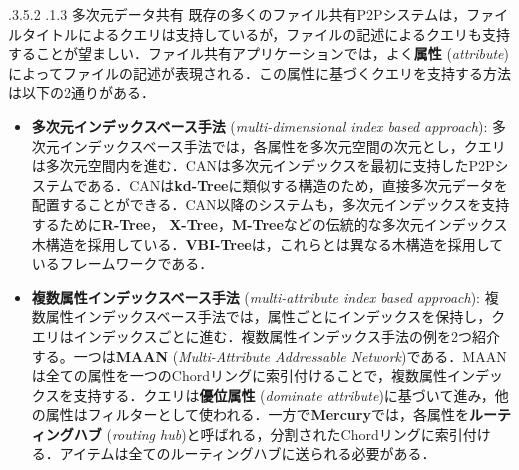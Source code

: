\documentclass{jarticle}
\makeatletter
\renewcommand{\subsection}{\@startsection{subsection}{2}{\z@}%
   {.3\Cvs \@plus.5\Cvs \@minus.2\Cvs}%
   {.1\Cvs \@plus.3\Cvs}%
   {\reset@font\large\bfseries}}
\makeatother
\begin{document}
{\small

\setcounter{section}{4} 
\setcounter{subsection}{0}

\subsection{多次元データ共有}
既存の多くのファイル共有P2Pシステムは，ファイルタイトルによるクエリは支持しているが，ファイルの記述によるクエリも支持することが望ましい．ファイル共有アプリケーションでは，よく\textbf{属性} (\textit{attribute})によってファイルの記述が表現される．この属性に基づくクエリを支持する方法は以下の2通りがある．
\begin{itemize}
	\item\textbf{多次元インデックスベース手法} (\textit{multi-dimensional index based approach}): 多次元インデックスベース手法では，各属性を多次元空間の次元とし，クエリは多次元空間内を進む．CANは多次元インデックスを最初に支持したP2Pシステムである．CANは\textbf{kd-Tree}に類似する構造のため，直接多次元データを配置することができる．CAN以降のシステムも，多次元インデックスを支持するために\textbf{R-Tree}， \textbf{X-Tree}，\textbf{M-Tree}などの伝統的な多次元インデックス木構造を採用している．\textbf{VBI-Tree}は，これらとは異なる木構造を採用しているフレームワークである．

	\item\textbf{複数属性インデックスベース手法} (\textit{multi-attribute index based approach}): 複数属性インデックスベース手法では，属性ごとにインデックスを保持し，クエリはインデックスごとに進む．複数属性インデックス手法の例を2つ紹介する。一つは\textbf{MAAN} (\textit{Multi-Attribute Addressable Network})である．MAANは全ての属性を一つのChordリングに索引付けることで，複数属性インデックスを支持する．クエリは\textbf{優位属性} (\textit{dominate attribute})に基づいて進み，他の属性はフィルターとして使われる．一方で\textbf{Mercury}では，各属性を\textbf{ルーティングハブ} (\textit{routing hub})と呼ばれる，分割されたChordリングに索引付ける．アイテムは全てのルーティングハブに送られる必要がある．
\end{itemize}

}
\end{document}
